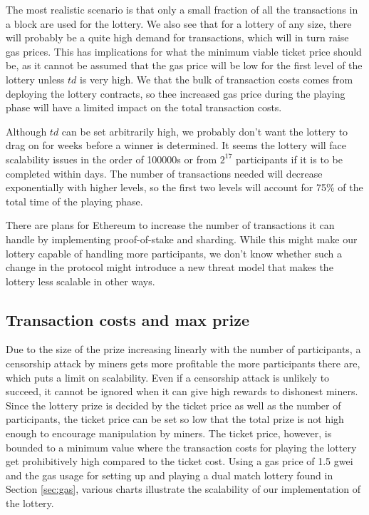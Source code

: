 The most realistic scenario is that only a small fraction of all the transactions in a block are used for the lottery. We also see that for a lottery of any size, there will probably be a quite high demand for transactions, which will in turn raise gas prices. This has implications for what the minimum viable ticket price should be, as it cannot be assumed that the gas price will be low for the first level of the lottery unless $td$ is very high. We that the bulk of transaction costs comes from deploying the lottery contracts, so thee increased gas price during the playing phase will have a limited impact on the total transaction costs.

Although $td$ can be set arbitrarily high, we probably don't want the lottery to drag on for weeks before a winner is determined. It seems the lottery will face scalability issues in the order of 100000s or from $2^{17}$ participants if it is to be completed within days. The number of transactions needed will decrease exponentially with higher levels, so the first two levels will account for 75\% of the total time of the playing phase. 

There are plans for Ethereum to increase the number of transactions it can handle by implementing proof-of-stake and sharding. While this might make our lottery capable of handling more participants, we don't know whether such a change in the protocol might introduce a new threat model that makes the lottery less scalable in other ways.

\subsection{Transaction costs and max prize}

Due to the size of the prize increasing linearly with the number of participants, a censorship attack by miners gets more profitable the more participants there are, which puts a limit on scalability. Even if a censorship attack is unlikely to succeed, it cannot be ignored when it can give high rewards to dishonest miners. Since the lottery prize is decided by the ticket price as well as the number of participants, the ticket price can be set so low that the total prize is not high enough to encourage manipulation by miners. The ticket price, however, is bounded to a minimum value where the transaction costs for playing the lottery get prohibitively high compared to the ticket cost. Using a gas price of 1.5 gwei and the gas usage for setting up and playing a dual match lottery found in Section \ref{sec:gas}, various charts illustrate the scalability of our implementation of the lottery.

